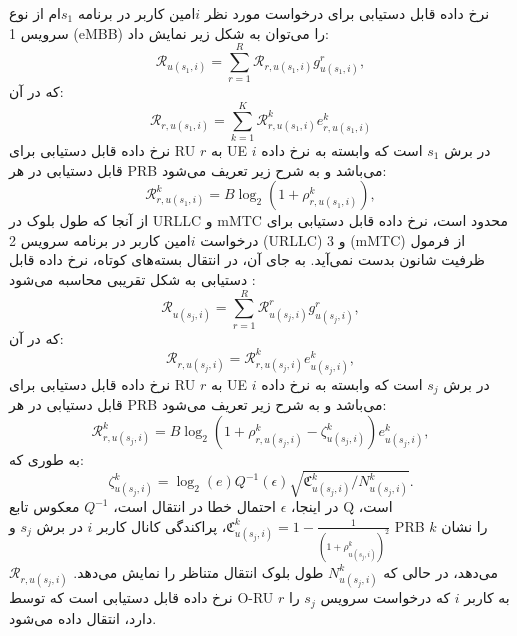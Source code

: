    نرخ داده قابل دستیابی برای درخواست مورد نظر $i$امین کاربر در برنامه $s_1$ام از نوع سرویس 1 (eMBB) را می‌توان به شکل زیر نمایش داد:
   \begin{equation}\label{eq3}
   	\mathcal{R}_{u(s_1,i)} = \sum_{r=1}^{R}\mathcal{R}_{r,u(s_1,i)} g^r_{u(s_1,i)},
   \end{equation}
   که در آن:
   \begin{equation}
   	\mathcal{R}_{r,u(s_1,i)} = \sum_{k=1}^{K} \mathcal{{R}}_{r,u(s_1,i)}^{k} e^k_{r,u(s_1,i)}
   \end{equation}
   نرخ داده قابل دستیابی برای RU $r$ به UE $i$ در برش $s_1$ است که وابسته به نرخ داده قابل دستیابی در هر PRB می‌باشد و به شرح زیر تعریف می‌شود:
   \begin{equation}
   	\mathcal{{R}}_{r,u(s_1,i)}^{k} =  B \log_2({1+ \rho_{r,u(s_1,i)}^{k}}),
   \end{equation}
   از آنجا که طول بلوک در URLLC و mMTC محدود است، نرخ داده قابل دستیابی برای درخواست $i$امین کاربر در برنامه سرویس 2 (URLLC) و 3 (mMTC) از فرمول ظرفیت شانون بدست نمی‌آید. به جای آن، در انتقال بسته‌های کوتاه، نرخ داده قابل دستیابی به شکل تقریبی محاسبه می‌شود \cite{setayesh2020joint}:
   \begin{equation}\label{eq11}
   	\mathcal{R}_{u(s_j,i)} = \sum_{r=1}^{R}\mathcal{R}_{u(s_j,i)}^{r} g^r_{u(s_j,i)},
   \end{equation}
   که در آن:
   \begin{equation}
   	\mathcal{R}_{r,u(s_j,i)} = \mathcal{{R}}_{r,u(s_j,i)}^{k}{e}_{u(s_j,i)}^{k},
   \end{equation}
   نرخ داده قابل دستیابی برای RU $r$ به UE $i$ در برش $s_j$ است که وابسته به نرخ داده قابل دستیابی در هر PRB می‌باشد و به شرح زیر تعریف می‌شود:
   \begin{equation}
   	\mathcal{{R}}_{r,u(s_j,i)}^{k} = B \log_2({1+ \rho_{r,u(s_j,i)}^{k}} - \zeta_{u(s_j,i)}^{k}){e}_{u(s_j,i)}^{k},
   \end{equation}
   به طوری که:
   \begin{equation}\label{shortPacket}
   	\zeta_{u(s_j,i)}^{k} = \log_2({e})Q^{-1}(\epsilon) \sqrt{\mathfrak{C}_{u(s_j,i)}^{k}/N_{u(s_j,i)}^{k}}.
   \end{equation}
در اینجا، $\epsilon$ احتمال خطا در انتقال است، $Q^{-1}$ معکوس تابع Q است، 
$\mathfrak{C}_{u(s_j,i)}^{k} = 1 - \frac{1}{(1+\rho_{u(s_j,i)}^{k})^2}$، پراکندگی کانال کاربر $i$ در برش $s_j$ و PRB $k$ را نشان می‌دهد، در حالی که
$N_{u(s_j,i)}^{k}$ طول بلوک انتقال متناظر را نمایش می‌دهد.
$\mathcal{R}_{r,u(s_j,i)}$ نرخ داده قابل دستیابی است که توسط O-RU $r$ به کاربر $i$ که درخواست سرویس $s_j$ را دارد، انتقال داده می‌شود.

